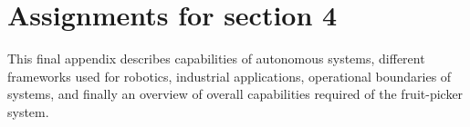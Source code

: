 \documentclass{modelica}
\begin{document}
\section[Section 1]{Assignments for section 4}
\label{paper-w4}
This final appendix describes capabilities of autonomous systems, different frameworks used for robotics, industrial applications, operational boundaries of systems, and finally an overview of overall capabilities required of the fruit-picker system.






%
%
%
%
%

%
%





%
%
%
%
\end{document}
